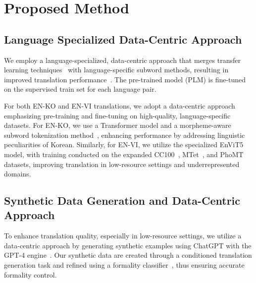 \documentclass{article}
\theoremstyle{plain}
\theoremstyle{definition}
\theoremstyle{remark}
\begin{document}
\section{Proposed Method}

\subsection{Language Specialized Data-Centric Approach}
We employ a language-specialized, data-centric approach that merges transfer learning techniques~\cite{zoph2016transfer} with language-specific subword methods, resulting in improved translation performance~\cite{zoph2016transfer, bojanowski2017enriching,park2020empirical,park2021should}. The pre-trained model (PLM) is fine-tuned on the supervised train set for each language pair.

For both EN-KO and EN-VI translations, we adopt a data-centric approach emphasizing pre-training and fine-tuning on high-quality, language-specific datasets. For EN-KO, we use a Transformer model and a morpheme-aware subword tokenization method~\cite{park2020empirical}, enhancing performance by addressing linguistic peculiarities of Korean. Similarly, for EN-VI, we utilize the specialized EnViT5~\cite{ngo2022mtet} model, with training conducted on the expanded CC100~\cite{wenzek-etal-2020-ccnet}, MTet~\cite{ngo2022mtet}, and PhoMT~\cite{doan-etal-2021-phomt} datasets, improving translation in low-resource settings and underrepresented domains.


\subsection{Synthetic Data Generation and Data-Centric Approach}
To enhance translation quality, especially in low-resource settings, we utilize a data-centric approach by generating synthetic examples using ChatGPT with the GPT-4 engine~\cite{openai2023gpt4}. Our synthetic data are created through a conditioned translation generation task and refined using a formality classifier~\cite{rippeth2022controlling}, thus ensuring accurate formality control.
\end{document}
